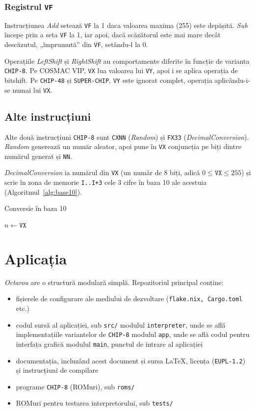 \documentclass[a4paper]{article}
\begin{document}
\subsubsection{Registrul \texttt{VF}}
Instrucțiunea \textit{Add} setează \texttt{VF} la 1 daca valoarea maxima (255) este depășită. \textit{Sub} începe prin a seta \texttt{VF} la 1, iar apoi,
dacă scăzătorul este mai mare decât descăzutul, „împrumută” din \texttt{VF}, setându-l la 0.

Operațiile \textit{LeftShift} și \textit{RightShift} au comportamente diferite în funcție de varianta \texttt{CHIP-8}. Pe COSMAC VIP, \texttt{VX} lua valoarea
lui \texttt{VY}, apoi i se aplica operația de bitshift. Pe \texttt{CHIP-48} și \texttt{SUPER-CHIP}, \texttt{VY} este ignorat complet, operația aplicându-i-se
numai lui \texttt{VX}.

\subsection{Alte instrucțiuni}
Alte două instrucțiuni \texttt{CHIP-8} sunt \texttt{CXNN} (\textit{Random}) și \texttt{FX33} (\textit{DecimalConversion}).
\textit{Random} generează un număr aleator, apoi pune în \texttt{VX} conjuncția pe biți dintre numărul generat și \texttt{NN}.

\textit{DecimalConversion} ia numărul din \texttt{VX} (un număr de 8 biți, adică $0 \leq \texttt{VX} \leq 255$) și scrie în zona de memorie \texttt{I..I+3}
cele 3 cifre în baza 10 ale acestuia (Algoritmul~\ref{alg:base10}).

\begin{algorithm}
	\caption{Conversie în baza 10}\label{alg:base10}
	$n \gets \texttt{VX}$\;
\end{algorithm}


\section{Aplicația}
\textit{Octarou} are o structură modulară simplă. Repozitoriul principal conține:
\begin{itemize}
	\item fișierele de configurare ale mediului de dezvoltare (\texttt{flake.nix, Cargo.toml} etc.)
	\item codul sursă al aplicației, sub \texttt{src/}
	      \subitem modulul \texttt{interpreter}, unde se află implementațiile variantelor de \texttt{CHIP-8}
	      \subitem modulul \texttt{app}, unde se află codul pentru interfața grafică
	      \subitem modulul \texttt{main}, punctul de intrare al aplicației
	\item documentația, incluzând acest document și sursa \LaTeX, licența (\texttt{EUPL-1.2}) și instrucțiuni de compilare
	\item programe \texttt{CHIP-8} (ROMuri), sub \texttt{roms/}
	\item ROMuri pentru testarea interpretorului, sub \texttt{tests/}
\end{itemize}
\end{document}
